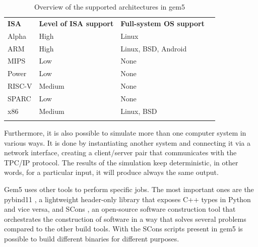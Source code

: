 \begin{table}[H]
\centering
\begin{tabular}{llll}
\cline{1-3}
\multicolumn{1}{|l|}{\cellcolor[HTML]{9B9B9B}\textbf{ISA}} & \multicolumn{1}{l|}{\cellcolor[HTML]{9B9B9B}\textbf{Level of ISA support}} & \multicolumn{1}{l|}{\cellcolor[HTML]{9B9B9B}\textbf{Full-system OS support}} &  \\ \cline{1-3}
\multicolumn{1}{|l|}{Alpha} & \multicolumn{1}{l|}{High} & \multicolumn{1}{l|}{Linux} &  \\ \cline{1-3}
\multicolumn{1}{|l|}{ARM} & \multicolumn{1}{l|}{High} & \multicolumn{1}{l|}{Linux, BSD, Android} &  \\ \cline{1-3}
\multicolumn{1}{|l|}{MIPS} & \multicolumn{1}{l|}{Low} & \multicolumn{1}{l|}{None} &  \\ \cline{1-3}
\multicolumn{1}{|l|}{Power} & \multicolumn{1}{l|}{Low} & \multicolumn{1}{l|}{None} &  \\ \cline{1-3}
\multicolumn{1}{|l|}{RISC-V} & \multicolumn{1}{l|}{Medium} & \multicolumn{1}{l|}{None} &  \\ \cline{1-3}
\multicolumn{1}{|l|}{SPARC} & \multicolumn{1}{l|}{Low} & \multicolumn{1}{l|}{None} &  \\ \cline{1-3}
\multicolumn{1}{|l|}{x86} & \multicolumn{1}{l|}{Medium} & \multicolumn{1}{l|}{Linux, BSD} &  \\ \cline{1-3}
 &  &  & 
\end{tabular}
\caption{Overview of the supported architectures in gem5 \cite{hempelsimulation}}
\label{tab_ISAsupport}
\end{table}

Furthermore, it is also possible to simulate more than one computer system in various ways. It is done by instantiating another system and connecting it via a network interface, creating a client/server pair that communicates with the TPC/IP protocol. The results of the simulation keep deterministic, in other words, for a particular input, it will produce always the same output. 

Gem5 uses other tools to perform specific jobs. The most important ones are the pybind11 \cite{jakob2019pybind11}, a lightweight header-only library that exposes C++ types in Python and vice versa, and SCons \cite{knight2002scons}, an open-source software construction tool that orchestrates the construction of software in a way that solves several problems compared to the other build tools. With the SCons scripts present in gem5 is possible to build different binaries for different purposes. 

